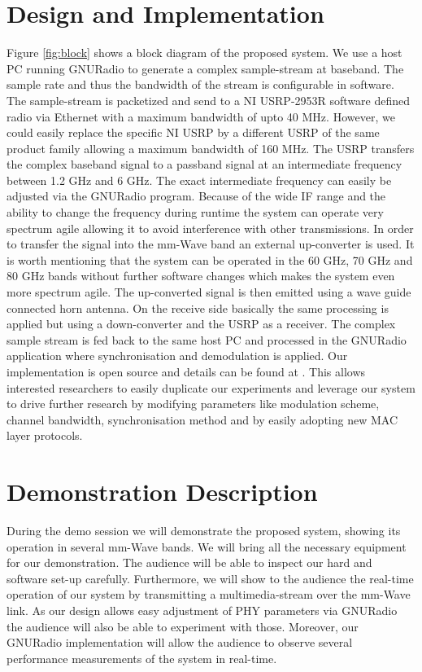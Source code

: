 \documentclass{acm_proc_article-sp}
\begin{document}
\section{Design and Implementation}
Figure \ref{fig:block} shows a block diagram of the proposed system. 
We use a host PC running GNURadio \cite{gnuradio} to generate a complex sample-stream at baseband. The sample rate and thus the bandwidth of the stream is configurable in software. The sample-stream is packetized and send to a NI USRP-2953R \cite{ettus} software defined radio via Ethernet with a maximum bandwidth of upto 40 MHz. However, we could easily replace the specific NI USRP by a different USRP of the same product family allowing a maximum bandwidth of 160 MHz.
The USRP transfers the complex baseband signal to a passband signal at an intermediate frequency between 1.2 GHz and 6 GHz. The exact intermediate frequency can easily be adjusted via the GNURadio program. Because of the wide IF range and the ability to change the frequency during runtime the system can operate very spectrum agile allowing it to avoid interference with other transmissions.
In order to transfer the signal into the mm-Wave band an external up-converter is used. It is worth mentioning that the system can be operated in the 60 GHz, 70 GHz and 80 GHz bands without further software changes which makes the system even more spectrum agile.
The up-converted signal is then emitted using a wave guide connected horn antenna.
On the receive side basically the same processing is applied but using a down-converter and the USRP as a receiver. The complex sample stream is fed back to the same host PC and processed in the GNURadio application where synchronisation and demodulation is applied.
Our implementation is open source and details can be found at \cite{gr-inets}. This allows interested researchers to easily duplicate our experiments and leverage our system to drive further research by modifying parameters like modulation scheme, channel bandwidth, synchronisation method and by easily adopting new MAC layer protocols.

\section{Demonstration Description} 
During the demo session we will demonstrate the proposed system, showing its operation in several mm-Wave bands. We will bring all the necessary equipment for our demonstration. The audience will be able to inspect our hard and software set-up carefully. Furthermore, we will show to the audience the real-time operation of our system by transmitting a multimedia-stream over the mm-Wave link. As our design allows easy adjustment of PHY parameters via GNURadio the audience will also be able to experiment with those. Moreover, our GNURadio implementation will allow the audience to observe several performance measurements of the system in real-time.
\end{document}
